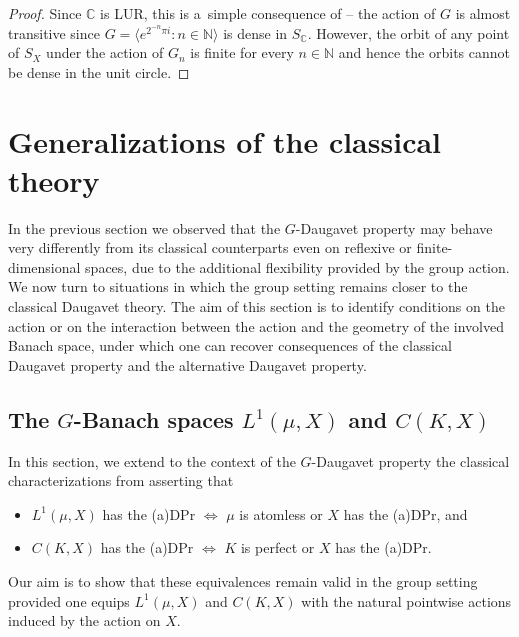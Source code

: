 \documentclass[a4paper,12pt]{amsart}
\theoremstyle{definition}
\theoremstyle{definition}
\theoremstyle{remark}
\numberwithin{equation}{section}
\newcommand{\C}{\mathbb{C}}
\newcommand{\N}{\mathbb{N}}
\newcommand{\<}{\langle}
\renewcommand{\>}{\rangle}
\begin{document}
	\begin{proof}
		Since $\C$ is LUR, this is a~simple consequence of  -- the action of $G$ is almost transitive since $G = \langle e^{2^{-n} \pi i} : n \in \N \rangle$ is dense in $S_\C$. However, the orbit of any point of $S_X$ under the action of $G_n$ is finite for every $n \in \N$ and hence the orbits cannot be dense in the unit circle.
	\end{proof}
	
	
	\section{Generalizations of the classical theory}
	
	
	
	In the previous section we observed that the $G$-Daugavet property may behave very differently from its classical counterparts even on reflexive or finite-dimensional spaces, due to the additional flexibility provided by the group action. We now turn to situations in which the group setting remains closer to the classical Daugavet theory. The aim of this section is to identify conditions on the action or on the interaction between the action and the geometry of the involved Banach space, under which one can recover consequences of the classical Daugavet property and the alternative Daugavet property.
	
	
	
	
	\subsection{The $G$-Banach spaces $L^1(\mu,X)$ and $C(K,X)$}
	\label{section:L1-and-CK} In this section, we extend to the context of the $G$-Daugavet property the classical characterizations from \cite{MO2004, MartinPaya2000} asserting that
	\begin{itemize}
		\item $L^1(\mu,X)$ has the (a)DPr $\Leftrightarrow$ $\mu$ is atomless or $X$ has the (a)DPr, and
		\item $C(K,X)$ has the (a)DPr $\Leftrightarrow$ $K$ is perfect or $X$ has the (a)DPr.
	\end{itemize}
	Our aim is to show that these equivalences remain valid in the group setting provided one equips $L^1(\mu,X)$ and $C(K,X)$ with the natural pointwise actions induced by the action on $X$.
	
\end{document}
